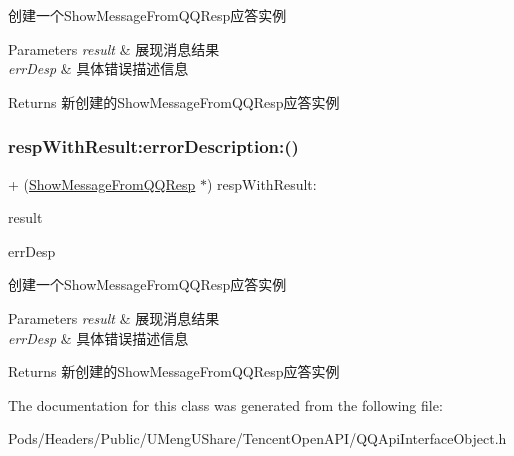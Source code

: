 创建一个\+Show\+Message\+From\+Q\+Q\+Resp应答实例 
\begin{DoxyParams}{Parameters}
{\em result} & 展现消息结果 \\
\hline
{\em err\+Desp} & 具体错误描述信息 \\
\hline
\end{DoxyParams}
\begin{DoxyReturn}{Returns}
新创建的\+Show\+Message\+From\+Q\+Q\+Resp应答实例 
\end{DoxyReturn}
\mbox{\label{interface_show_message_from_q_q_resp_a34158f51c1102cb5a75fb90eab156ad4}} 
\subsubsection{\texorpdfstring{resp\+With\+Result\+:error\+Description\+:()}{respWithResult:errorDescription:()}\hspace{0.1cm}{\footnotesize\ttfamily [2/2]}}
{\footnotesize\ttfamily + (\mbox{\hyperlink{interface_show_message_from_q_q_resp}{Show\+Message\+From\+Q\+Q\+Resp}} $\ast$) resp\+With\+Result\+: \begin{DoxyParamCaption}\item[{(N\+S\+String $\ast$)}]{result }\item[{errorDescription:(N\+S\+String $\ast$)}]{err\+Desp }\end{DoxyParamCaption}}

创建一个\+Show\+Message\+From\+Q\+Q\+Resp应答实例 
\begin{DoxyParams}{Parameters}
{\em result} & 展现消息结果 \\
\hline
{\em err\+Desp} & 具体错误描述信息 \\
\hline
\end{DoxyParams}
\begin{DoxyReturn}{Returns}
新创建的\+Show\+Message\+From\+Q\+Q\+Resp应答实例 
\end{DoxyReturn}


The documentation for this class was generated from the following file\+:\begin{DoxyCompactItemize}
\item 
Pods/\+Headers/\+Public/\+U\+Meng\+U\+Share/\+Tencent\+Open\+A\+P\+I/Q\+Q\+Api\+Interface\+Object.\+h\end{DoxyCompactItemize}
